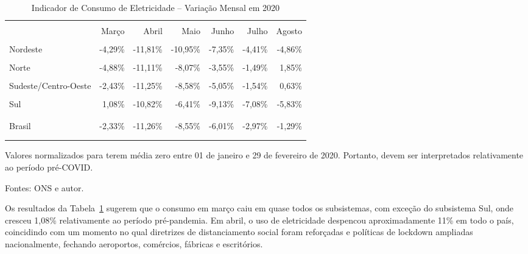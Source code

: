 \documentclass[12pt]{article}
\begin{document}
\begin{table}[!hp]
	\centering
	\caption{Indicador de Consumo de Eletricidade -- Variação Mensal em 2020}
	\label{tab:table1}
	\begin{threeparttable}[!hp]
		\begin{tabular}{lrrrrrr}
			\\[-0.75em] \toprule \\[-1em]
			{} &  Março &  Abril &  Maio &  Junho &  Julho &  Agosto \\
			\midrule \\[-1em]
			Nordeste             &       -4,29\% &      -11,81\% &      -10,95\% &       -7,35\% &       -4,41\% &       -4,86\% \\ \\[-1em]
			Norte                 &       -4,88\% &      -11,11\% &       -8,07\% &       -3,55\% &       -1,49\% &        1,85\% \\ \\[-1em]
			Sudeste/Centro-Oeste &       -2,43\% &      -11,25\% &       -8,58\% &       -5,05\% &       -1,54\% &        0,63\% \\ \\[-1em]
			Sul                 &        1,08\% &      -10,82\% &       -6,41\% &       -9,13\% &       -7,08\% &       -5,83\% \\ \\[-1em] \hdashline[2pt/3pt] \\[-0.75em]
			Brasil                &       -2,33\% &      -11,26\% &       -8,55\% &       -6,01\% &       -2,97\% &       -1,29\% \\ \\[-1em]
			\bottomrule \\[-0.75em]
		\end{tabular}
		\begin{tablenotes}
			\item[1] \small Valores normalizados para terem média zero entre 01 de janeiro e 29 de fevereiro de 2020. Portanto, devem ser interpretados relativamente ao período pré-COVID.
			\item[2] \small Fontes: ONS e autor.
		\end{tablenotes}
	\end{threeparttable}
\end{table} 

Os resultados da Tabela~{\ref{tab:table1}} sugerem que o consumo em março caiu em quase todos os subsistemas, com exceção do subsistema Sul, onde cresceu 1,08\% relativamente ao período pré-pandemia. Em abril, o uso de eletricidade despencou aproximadamente 11\% em todo o país, coincidindo com um momento no qual diretrizes de distanciamento social foram reforçadas e políticas de lockdown ampliadas nacionalmente, fechando aeroportos, comércios, fábricas e escritórios. 
\end{document}
